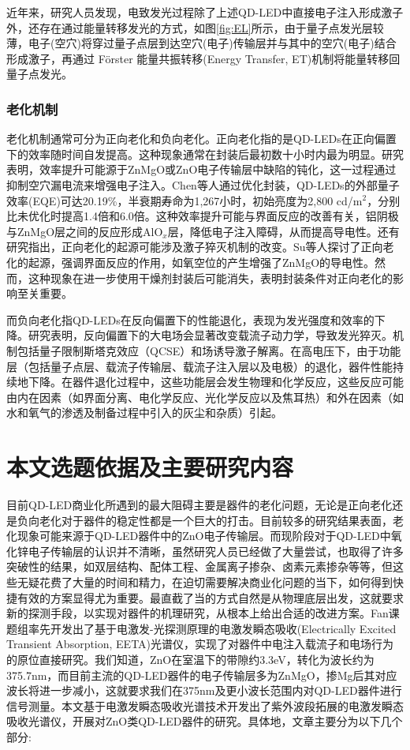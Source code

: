 近年来，研究人员发现，电致发光过程除了上述QD-LED中直接电子注入形成激子外，还存在通过能量转移发光的方式，如图\ref{fig:EL}所示，由于量子点发光层较薄，电子(空穴)将穿过量子点层到达空穴(电子)传输层并与其中的空穴(电子)结合形成激子，再通过 Förster 能量共振转移(Energy Transfer, ET)机制将能量转移回量子点发光。

\subsubsection{老化机制}
老化机制通常可分为正向老化和负向老化。正向老化指的是QD-LEDs在正向偏置下的效率随时间自发提高。这种现象通常在封装后最初数十小时内最为明显。研究表明，效率提升可能源于ZnMgO或ZnO电子传输层中缺陷的钝化，这一过程通过抑制空穴漏电流来增强电子注入。Chen等人通过优化封装，QD-LEDs的外部量子效率(EQE)可达20.19\%，半衰期寿命为1,267小时，初始亮度为2,800 cd/m$^2$，分别比未优化时提高1.4倍和6.0倍\cite{Chen}。这种效率提升可能与界面反应的改善有关，铝阴极与ZnMgO层之间的反应形成AlO$_x$层，降低电子注入障碍，从而提高导电性。还有研究指出，正向老化的起源可能涉及激子猝灭机制的改变。Su等人探讨了正向老化的起源，强调界面反应的作用，如氧空位的产生增强了ZnMgO的导电性。然而，这种现象在进一步使用干燥剂封装后可能消失，表明封装条件对正向老化的影响至关重要\cite{201800549}。

而负向老化指QD-LEDs在反向偏置下的性能退化，表现为发光强度和效率的下降。研究表明，反向偏置下的大电场会显著改变载流子动力学，导致发光猝灭。机制包括量子限制斯塔克效应（QCSE）和场诱导激子解离。在高电压下，由于功能层（包括量子点层、载流子传输层、载流子注入层以及电极）的退化，器件性能持续地下降。在器件退化过程中，这些功能层会发生物理和化学反应，这些反应可能由内在因素（如界面分离、电化学反应、光化学反应以及焦耳热）和外在因素（如水和氧气的渗透及制备过程中引入的灰尘和杂质）引起。

\section{本文选题依据及主要研究内容}
目前QD-LED商业化所遇到的最大阻碍主要是器件的老化问题，无论是正向老化还是负向老化对于器件的稳定性都是一个巨大的打击。目前较多的研究结果表面，老化现象可能来源于QD-LED器件中的ZnO电子传输层。而现阶段对于QD-LED中氧化锌电子传输层的认识并不清晰，虽然研究人员已经做了大量尝试，也取得了许多突破性的结果，如双层结构、配体工程、金属离子掺杂、卤素元素掺杂等等，但这些无疑花费了大量的时间和精力，在迫切需要解决商业化问题的当下，如何得到快捷有效的方案显得尤为重要。最直截了当的方式自然是从物理底层出发，这就要求新的探测手段，以实现对器件的机理研究，从根本上给出合适的改进方案。Fan课题组率先开发出了基于电激发-光探测原理的电激发瞬态吸收(Electrically Excited Transient Absorption, EETA)光谱仪，实现了对器件中电注入载流子和电场行为的原位直接研究\cite{li2024transient,1025004826.nh}。我们知道，ZnO在室温下的带隙约3.3eV，转化为波长约为375.7nm，而目前主流的QD-LED器件的电子传输层多为ZnMgO，掺Mg后其对应波长将进一步减小，这就要求我们在375nm及更小波长范围内对QD-LED器件进行信号测量。本文基于电激发瞬态吸收光谱技术开发出了紫外波段拓展的电激发瞬态吸收光谱仪，开展对ZnO类QD-LED器件的研究。具体地，文章主要分为以下几个部分:

